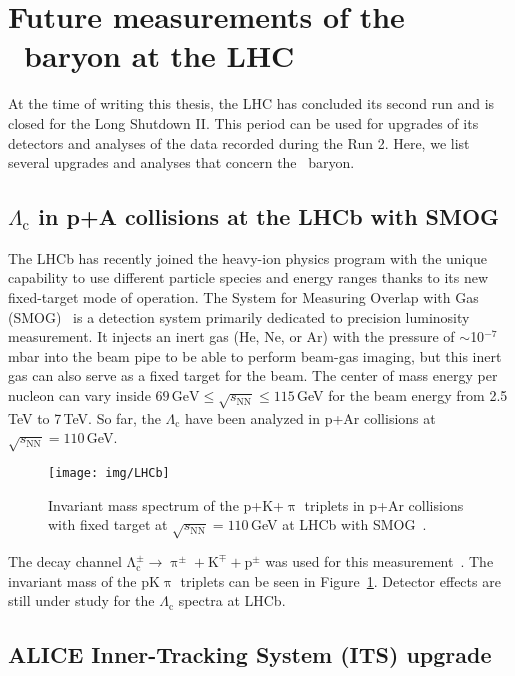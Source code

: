 \section{Future measurements of the \Lambdac\ baryon at the LHC}
At the time of writing this thesis, the LHC has concluded its second run and is closed for the Long Shutdown II\@. This period can be used for upgrades of its detectors and analyses of the data recorded during the Run 2\@. Here, we list several upgrades and analyses that concern the \Lambdac\ baryon.


\subsection{$\Lambda_\mathrm{c}$ in p+A collisions at the LHCb with SMOG}
The LHCb has recently joined the heavy-ion physics program with the unique capability to use different particle species and energy ranges thanks to its new fixed-target mode of operation. The System for Measuring Overlap with Gas (SMOG)~\cite{SMOG} is a detection system primarily dedicated to precision luminosity measurement. It injects an inert gas (He, Ne, or Ar) with the pressure of $\sim$10$^{-7}\,$mbar into the beam pipe to be able to perform beam-gas imaging, but this inert gas can also serve as a fixed target for the beam. The center of mass energy per nucleon can vary inside $69\,\text{GeV} \leq \sqrt{s_\mathrm{NN}} \leq 115\,$GeV for the beam energy from 2.5$\,$TeV to 7$\,$TeV\@. So far, the $\Lambda_\mathrm{c}$ have been analyzed in p+Ar collisions at $\sqrt{s_\mathrm{NN}} = 110\,$GeV\@.

\begin{figure}[!htb]
\centering
\texttt{[image: img/LHCb]}
\caption{Invariant mass spectrum of the p+K+$\uppi$ triplets in p+Ar collisions with fixed target at $\sqrt{s_\mathrm{NN}} = 110\,$GeV at LHCb with SMOG~\cite{LHCbQMpresentation}.}
\label{fig:LHCb}
\end{figure}

The decay channel $\mathrm{\Lambda_c^\pm \rightarrow \uppi^\pm + K^\mp + p^\pm}$ was used for this measurement~\cite{LHCbQMpresentation}. The invariant mass of the pK$\uppi$ triplets can be seen in Figure~\ref{fig:LHCb}. Detector effects are still under study for the $\Lambda_\mathrm{c}$ spectra at LHCb.

\subsection{ALICE Inner-Tracking System (ITS) upgrade}

